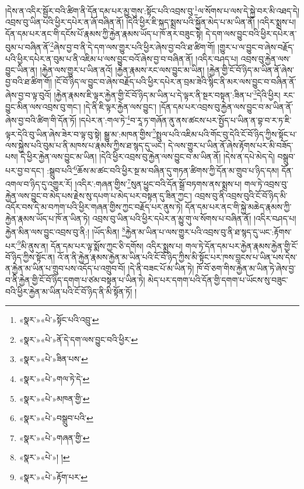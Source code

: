 །དེས་ན་འདིར་སྦྱོར་བའི་ཚིག་ནི་དོན་དམ་པར་མྱུ་གུས་:སྟོང་པའི་འབྲས་བུ་\footnote{«སྣར་»«པེ་»སྟོང་པའི་འབྲུ་}ལ་སོགས་པ་ལས་དེ་སྐྱེ་བར་མི་འཐད་དེ། འབྲས་བུ་ཡིན་པའི་ཕྱིར་དཔེར་ན་ཞོ་བཞིན་ནོ། །དེའི་ཕྱིར་ཇི་སྐད་སྨྲས་པའི་སྐྱོན་མེད་པ་མ་ཡིན་ནོ། །འདིར་སྨྲས་པ། དོན་དམ་པར་ནང་གི་དངོས་པོ་རྣམས་ཀྱི་རྐྱེན་རྣམས་ཡོད་པ་ཁོ་ནར་བཟུང་སྟེ། དེ་དག་ལས་བྱུང་བའི་ཕྱིར་དཔེར་ན་བུམ་པ་བཞིན་ནོ་\footnote{«སྣར་»«པེ་»ནོ་དེ་དག་ལས་བྱུང་བའི་ཕྱིར་}ཞེས་བྱ་བ་ནི་དེ་དག་ལས་གྱུར་པའི་ཕྱིར་ཞེས་བྱ་བའི་ཐ་ཚིག་གོ། །གྱུར་པ་ལ་བྱུང་བ་ཞེས་བརྗོད་པའི་ཕྱིར་དཔེར་ན་བུམ་པ་ནི་འཇིམ་པ་ལས་བྱུང་བའོ་ཞེས་བྱ་བ་བཞིན་ནོ། །འདིར་བཤད་པ། འབྲས་བུ་རྐྱེན་ལས་བྱུང་ཡིན་ན། །རྐྱེན་ལས་གྱུར་པ་ཡིན་ནའོ། །རྐྱེན་རྣམས་རང་ལས་བྱུང་མ་ཡིན། །རྐྱེན་གྱི་ངོ་བོ་ཉིད་མ་ཡིན་ནོ་ཞེས་བྱ་བའི་ཐ་ཚིག་གོ། །ངོ་བོ་ཉིད་ལ་བྱུང་བ་ཞེས་བརྗོད་པའི་ཕྱིར་དཔེར་ན་བྲམ་ཟེའི་སྙིང་ནི་མར་ལས་བྱུང་བ་བཞིན་ནོ་ཞེས་བྱ་བ་ལྟ་བུའོ། །རྐྱེན་རྣམས་ཇི་ལྟར་རྐྱེན་གྱི་ངོ་བོ་ཉིད་མ་ཡིན་པ་དེ་ལྟར་ནི་སྔར་བསྟན་:ཟིན་པ་\footnote{«སྣར་»«པེ་»ཟིན་པས་}དེའི་ཕྱིར། རང་བྱུང་མིན་ལས་འབྲས་བུ་གང་། །དེ་ནི་ཇི་ལྟར་རྐྱེན་ལས་བྱུང་། །དོན་དམ་པར་འབྲས་བུ་རྐྱེན་ལས་བྱུང་བ་མ་ཡིན་ནོ་ཞེས་བྱ་བའི་ཚིག་གི་དོན་ཏོ། །དཔེར་ན་:གལ་ཏེ་\footnote{«སྣར་»«པེ་»གལ་ཏེ་དེ་}བ་རཱ་ཏ་གཞོན་ནུ་ནས་ཚངས་པར་སྤྱོད་པ་ཡིན་ན་བྷ་བ་ར་ཏ་ཇི་ལྟར་དེའི་བུ་ཡིན་ཞེས་ཟེར་བ་ལྟ་བུ་སྟེ། སྒྱུ་མ་:མཁན་གྱིས་\footnote{«སྣར་»«པེ་»མཁན་གྱི་}སྤྲུལ་པའི་འཇིམ་པའི་གོང་བུ་དེའི་ངོ་བོ་ཉིད་ཀྱིས་སྟོང་པ་ལས་སྐྱེས་པའི་བུམ་པ་ནི་མཁས་པ་རྣམས་ཀྱིས་ཐ་སྙད་དུ་ཡང་། དེ་ལས་གྱུར་པ་ཡིན་ནོ་ཞེས་རྟོགས་པར་མི་བཟོད་པས། དེ་ཕྱིར་རྐྱེན་ལས་བྱུང་མ་ཡིན། །དེའི་ཕྱིར་འབྲས་བུ་རྐྱེན་ལས་བྱུང་བ་མ་ཡིན་ནོ། །དེས་ན་དཔེ་མེད་དེ། བསྒྲུབ་པར་བྱ་བ་དང་། :སྒྲུབ་པའི་\footnote{«སྣར་»«པེ་»བསྒྲུབ་པའི་}ཆོས་མ་ཚང་བའི་ཕྱིར་སྔ་མ་བཞིན་དུ་གཏན་ཚིགས་ཀྱི་དོན་མ་གྲུབ་པ་ཉིད་དམ། དོན་འགལ་བ་ཉིད་དུ་འགྱུར་རོ། །འདིར་:གཞན་གྱིས་\footnote{«སྣར་»«པེ་»གཞན་གྱི་}སུན་ཕྱུང་བའི་དོན་སྒྲོ་བཏགས་ནས་སྨྲས་པ། གལ་ཏེ་འབྲས་བུ་རྐྱེན་ལས་བྱུང་བ་མེད་པས་རྗེས་སུ་དཔག་པ་མེད་པར་བསྟན་དུ་ཟིན་ཀྱང་། འབྲས་བུ་ནི་འབྲས་བུའི་ངོ་བོ་ཉིད་མི་འདོར་བས་དེ་མ་བཀག་པའི་ཕྱིར་གཞན་གྱིས་ཀྱང་བརྗོད་པར་ནུས་ཏེ། དོན་དམ་པར་ནང་གི་སྐྱེ་མཆེད་རྣམས་ཀྱི་རྐྱེན་རྣམས་ཡོད་པ་ཁོ་ན་ཡིན་ཏེ། འབྲས་བུ་ཡིན་པའི་ཕྱིར་དཔེར་ན་མྱུ་གུ་ལ་སོགས་པ་བཞིན་ནོ། །འདིར་བཤད་པ། རྐྱེན་མིན་ལས་བྱུང་འབྲས་བུ་ནི:། །ཡོད་མིན། \footnote{«སྣར་»«པེ་»། ། }རྐྱེན་མ་ཡིན་པ་ལས་གྱུར་པའི་འབྲས་བུ་ནི་ཐ་སྙད་དུ་ཡང་:རྟོགས་པར་\footnote{«སྣར་»«པེ་»རྟོག་པར་}མི་ནུས་ན། དོན་དམ་པར་ལྟ་སྨོས་ཀྱང་ཅི་དགོས། འདིར་སྨྲས་པ། གལ་ཏེ་དོན་དམ་པར་རྐྱེན་རྣམས་རྐྱེན་གྱི་ངོ་བོ་ཉིད་ཀྱིས་སྟོང་ན། འོ་ན་ནི་རྐྱེན་རྣམས་རྐྱེན་མ་ཡིན་པའི་ངོ་བོ་ཉིད་ཀྱིས་མི་སྟོང་པར་ཁས་བླངས་པ་ཡིན་པས་དེས་ན་རྐྱེན་མ་ཡིན་པ་གྲུབ་པས་འདོད་པ་འགྲུབ་བོ། །དེ་ནི་བཟང་པོ་མ་ཡིན་ཏེ། ཁོ་བོ་ཅག་གིས་རྐྱེན་མ་ཡིན་ཏེ་ཞེས་བྱ་བ་ནི་རྐྱེན་གྱི་ངོ་བོ་ཉིད་དགག་པ་ཙམ་བསྟན་པ་ཡིན་ཏེ། མེད་པར་དགག་པའི་དོན་གྱི་དགག་པ་ཡོངས་སུ་བཟུང་བའི་ཕྱིར་རྐྱེན་མ་ཡིན་པའི་ངོ་བོ་ཉིད་ནི་མི་སྟོན་ཏོ། །
